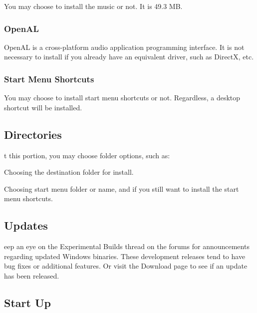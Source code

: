 You may choose to install the music or not. It is 49.3 MB.

\subsubsection{OpenAL}


OpenAL is a cross-platform audio application programming interface. It is not necessary to install if you already have an equivalent driver, such as DirectX, etc.

\subsubsection{Start Menu Shortcuts}

You may choose to install start menu shortcuts or not. Regardless, a desktop shortcut will be installed.  

\subsection{Directories}

t this portion, you may choose folder options, such as:

\begin{changemargin}{0.5cm}{0cm}
Choosing the destination folder for install.

Choosing start menu folder or name, and if you still want to install the start menu shortcuts.
\end{changemargin}

\subsection{Updates}

eep an eye on the Experimental Builds thread on the forums for announcements regarding updated Windows binaries. These development releases tend to have bug fixes or additional features. Or visit the Download page to see if an update has been released.

\subsection{Start Up}



